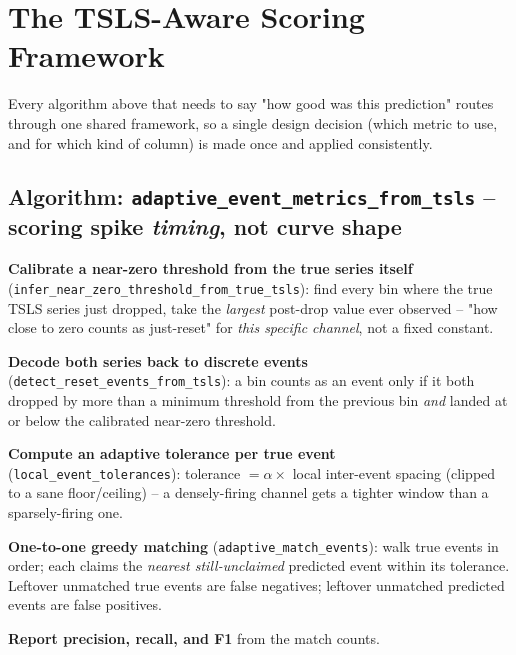 \documentclass[11pt]{article}
\begin{document}
\newpage
\section{The TSLS-Aware Scoring Framework}
\label{sec:scoring}
Every algorithm above that needs to say "how good was this prediction" routes through one shared framework, so a single design decision (which metric to use, and for which kind of column) is made once and applied consistently.

\subsection{Algorithm: \texttt{adaptive\_event\_metrics\_from\_tsls} -- scoring spike \emph{timing}, not curve shape}
\label{sec:adaptive-events}
\begin{steps}
\item \textbf{Calibrate a near-zero threshold from the true series itself} (\texttt{infer\_near\_zero\_threshold\_from\_true\_tsls}): find every bin where the true TSLS series just dropped, take the \emph{largest} post-drop value ever observed -- "how close to zero counts as just-reset" for \emph{this specific channel}, not a fixed constant.
\item \textbf{Decode both series back to discrete events} (\texttt{detect\_reset\_events\_from\_tsls}): a bin counts as an event only if it both dropped by more than a minimum threshold from the previous bin \emph{and} landed at or below the calibrated near-zero threshold.
\item \textbf{Compute an adaptive tolerance per true event} (\texttt{local\_event\_tolerances}): tolerance $= \alpha \times$ local inter-event spacing (clipped to a sane floor/ceiling) -- a densely-firing channel gets a tighter window than a sparsely-firing one.
\item \textbf{One-to-one greedy matching} (\texttt{adaptive\_match\_events}): walk true events in order; each claims the \emph{nearest still-unclaimed} predicted event within its tolerance. Leftover unmatched true events are false negatives; leftover unmatched predicted events are false positives.
\item \textbf{Report precision, recall, and F1} from the match counts.
\end{steps}
\end{document}
